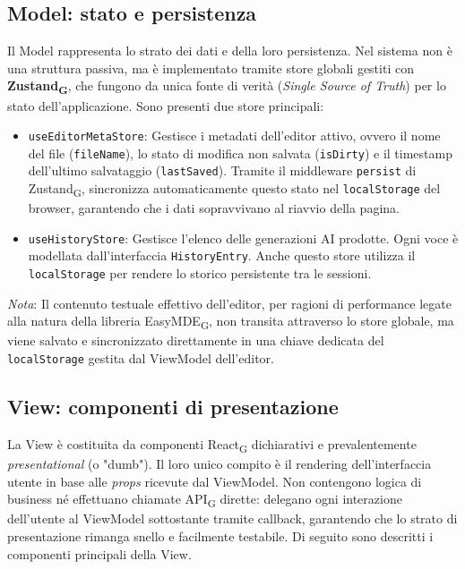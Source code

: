 \documentclass[11pt,a4paper]{article}
\newcommand{\gls}[1]{#1\textsubscript{G}}
\begin{document}
\subsection{Model: stato e persistenza}
Il Model rappresenta lo strato dei dati e della loro persistenza. Nel sistema non è una struttura passiva, ma è implementato tramite store globali gestiti con \textbf{\gls{Zustand}}, che fungono da unica fonte di verità (\textit{Single Source of Truth}) per lo stato dell'applicazione.
Sono presenti due store principali:
\begin{itemize}
    \item \texttt{useEditorMetaStore}: Gestisce i metadati dell'editor attivo, ovvero il nome del file (\texttt{fileName}), lo stato di modifica non salvata (\texttt{isDirty}) e il timestamp dell'ultimo salvataggio (\texttt{lastSaved}). Tramite il middleware \texttt{persist} di \gls{Zustand}, sincronizza automaticamente questo stato nel \texttt{localStorage} del browser, garantendo che i dati sopravvivano al riavvio della pagina.
    \item \texttt{useHistoryStore}: Gestisce l'elenco delle generazioni AI prodotte. Ogni voce è modellata dall'interfaccia \texttt{HistoryEntry}. Anche questo store utilizza il \texttt{localStorage} per rendere lo storico persistente tra le sessioni.
\end{itemize}

\textit{Nota}: Il contenuto testuale effettivo dell'editor, per ragioni di performance legate alla natura della libreria \gls{EasyMDE}, non transita attraverso lo store globale, ma viene salvato e sincronizzato direttamente in una chiave dedicata del \texttt{localStorage} gestita dal ViewModel dell'editor.


\newpage
\subsection{View: componenti di presentazione}
La View è costituita da componenti \gls{React} dichiarativi e prevalentemente \textit{presentational} (o "dumb"). Il loro unico compito è il rendering dell'interfaccia utente in base alle \textit{props} ricevute dal ViewModel. Non contengono logica di business né effettuano chiamate \gls{API} dirette: delegano ogni interazione dell'utente al ViewModel sottostante tramite callback, garantendo che lo strato di presentazione rimanga snello e facilmente testabile.
Di seguito sono descritti i componenti principali della View.
\end{document}

